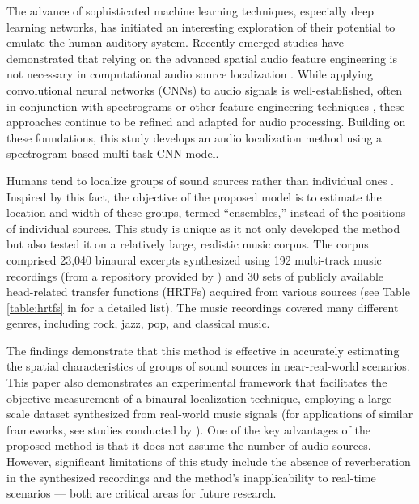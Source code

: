 \documentclass[11pt]{article}
\begin{document}
The advance of sophisticated machine learning techniques, especially deep learning networks, has initiated an interesting exploration of their potential to emulate the human auditory system. Recently emerged studies have demonstrated that relying on the advanced spatial audio feature engineering is not necessary in computational audio source localization \parencite{vera-diaz_towards_2018, pang_multitask_2019, yang_deepear_2022}. While applying convolutional neural networks (CNNs) \parencite{lecun_handwritten_1989} to audio signals is well-established, often in conjunction with spectrograms \parencite{thomas_analyzing_2014, espi_exploiting_2015, han_convolutional_2017} or other feature engineering techniques \parencite{abdel-hamid_applying_2012, sainath_deep_2013}, these approaches continue to be refined and adapted for audio processing. Building on these foundations, this study develops an audio localization method using a spectrogram-based multi-task CNN model.

Humans tend to localize groups of sound sources rather than individual ones \parencite{bregman_auditory_1990, rumsey_spatial_2002}. Inspired by this fact, the objective of the proposed model is to estimate the location and width of these groups, termed ``ensembles,'' instead of the positions of individual sources. This study is unique as it not only developed the method but also tested it on a relatively large, realistic music corpus. The corpus comprised 23,040 binaural excerpts synthesized using 192 multi-track music recordings (from a repository provided by \textcite{senior_mixing_2023}) and 30 sets of publicly available head-related transfer functions (HRTFs) acquired from various sources (see Table \ref{table:hrtfs} in  for a detailed list). The music recordings covered many different genres, including rock, jazz, pop, and classical music.

The findings demonstrate that this method is effective in accurately estimating the spatial characteristics of groups of sound sources in near-real-world scenarios. This paper also demonstrates an experimental framework that facilitates the objective measurement of a binaural localization technique, employing a large-scale dataset synthesized from real-world music signals (for applications of similar frameworks, see studies conducted by \textcite{antoniuk_blind_2023, zielinski_automatic_2022, zielinski_spatial_2022, zielinski_comparison_2020}). One of the key advantages of the proposed method is that it does not assume the number of audio sources. However, significant limitations of this study include the absence of reverberation in the synthesized recordings and the method's inapplicability to real-time scenarios --- both are critical areas for future research.
\end{document}

